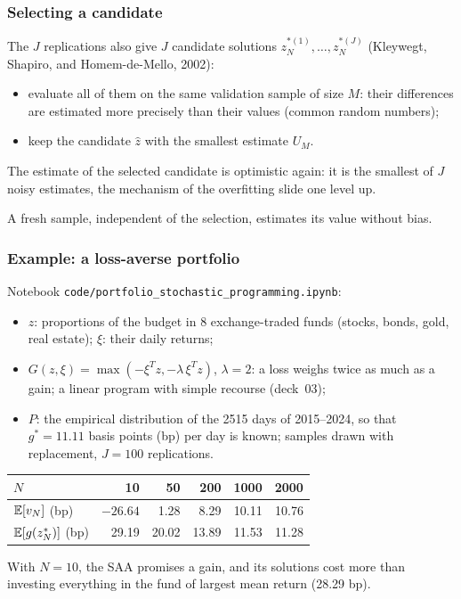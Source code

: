 \documentclass[aspectratio=169]{beamer}
\begin{document}
\begin{frame}
\frametitle{Selecting a candidate}

The $J$ replications also give $J$ candidate solutions $z_N^{*(1)}, \ldots, z_N^{*(J)}$ (Kleywegt, Shapiro, and Homem-de-Mello, 2002):
\begin{itemize}
\item
evaluate all of them on the {\blue same} validation sample of size $M$: their differences are estimated more precisely than their values (common random numbers);
\item
keep the candidate $\hat{z}$ with the smallest estimate $U_M$.
\end{itemize}

\mbox{}

The estimate of the selected candidate is {\red optimistic} again: it is the smallest of $J$ noisy estimates, the mechanism of the overfitting slide one level up.

\mbox{}

A {\blue fresh} sample, independent of the selection, estimates its value without bias.

\end{frame}

\begin{frame}
\frametitle{Example: a loss-averse portfolio}

Notebook {\tt code/portfolio\_stochastic\_programming.ipynb}:
\begin{itemize}
\item
$z$: proportions of the budget in 8 exchange-traded funds (stocks, bonds, gold, real estate); $\xi$: their daily returns;
\item
$G(z,\xi) = \max(-\xi^Tz, -\lambda\, \xi^Tz)$, $\lambda = 2$: a loss weighs twice as much as a gain; a linear program with simple recourse (deck~03);
\item
$P$: the empirical distribution of the 2515 days of 2015--2024, so that $g^* = 11.11$ basis points (bp) per day is known; samples drawn with replacement, $J = 100$ replications.
\end{itemize}

\begin{center}
\begin{tabular}{l|rrrrr}
$N$ & 10 & 50 & 200 & 1000 & 2000 \\
\hline
${\mathbb{E}}[v_N]$ (bp) & $-26.64$ & 1.28 & 8.29 & 10.11 & 10.76 \\
${\mathbb{E}}[g(z_N^*)]$ (bp) & 29.19 & 20.02 & 13.89 & 11.53 & 11.28
\end{tabular}
\end{center}

With $N = 10$, the SAA promises a gain, and its solutions cost more than investing everything in the fund of largest mean return (28.29 bp).

\end{frame}
\end{document}
